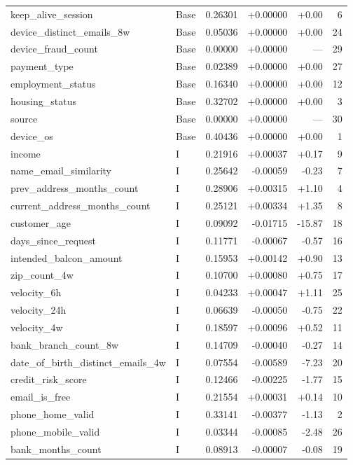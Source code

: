 \begin{longtable}{@{}llrrrr@{}}
keep\_alive\_session & Base & 0.26301 & +0.00000 & +0.00 & 6 \\
device\_distinct\_emails\_8w & Base & 0.05036 & +0.00000 & +0.00 & 24 \\
device\_fraud\_count & Base & 0.00000 & +0.00000 & --- & 29 \\
payment\_type & Base & 0.02389 & +0.00000 & +0.00 & 27 \\
employment\_status & Base & 0.16340 & +0.00000 & +0.00 & 12 \\
housing\_status & Base & 0.32702 & +0.00000 & +0.00 & 3 \\
source & Base & 0.00000 & +0.00000 & --- & 30 \\
device\_os & Base & 0.40436 & +0.00000 & +0.00 & 1 \\
income & I & 0.21916 & +0.00037 & +0.17 & 9 \\
name\_email\_similarity & I & 0.25642 & -0.00059 & -0.23 & 7 \\
prev\_address\_months\_count & I & 0.28906 & +0.00315 & +1.10 & 4 \\
current\_address\_months\_count & I & 0.25121 & +0.00334 & +1.35 & 8 \\
customer\_age & I & 0.09092 & -0.01715 & -15.87 & 18 \\
days\_since\_request & I & 0.11771 & -0.00067 & -0.57 & 16 \\
intended\_balcon\_amount & I & 0.15953 & +0.00142 & +0.90 & 13 \\
zip\_count\_4w & I & 0.10700 & +0.00080 & +0.75 & 17 \\
velocity\_6h & I & 0.04233 & +0.00047 & +1.11 & 25 \\
velocity\_24h & I & 0.06639 & -0.00050 & -0.75 & 22 \\
velocity\_4w & I & 0.18597 & +0.00096 & +0.52 & 11 \\
bank\_branch\_count\_8w & I & 0.14709 & -0.00040 & -0.27 & 14 \\
date\_of\_birth\_distinct\_emails\_4w & I & 0.07554 & -0.00589 & -7.23 & 20 \\
credit\_risk\_score & I & 0.12466 & -0.00225 & -1.77 & 15 \\
email\_is\_free & I & 0.21554 & +0.00031 & +0.14 & 10 \\
phone\_home\_valid & I & 0.33141 & -0.00377 & -1.13 & 2 \\
phone\_mobile\_valid & I & 0.03344 & -0.00085 & -2.48 & 26 \\
bank\_months\_count & I & 0.08913 & -0.00007 & -0.08 & 19 \\

\end{longtable}
